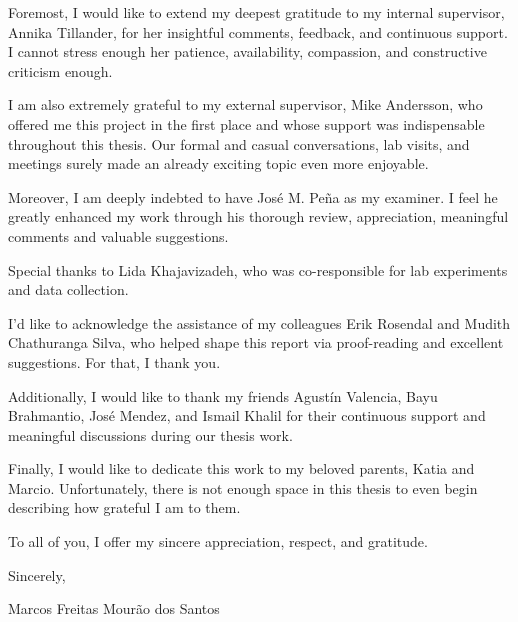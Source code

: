 

Foremost, I would like to extend my deepest gratitude to my internal supervisor, Annika Tillander, for her insightful comments, feedback, and continuous support. I cannot stress enough her patience, availability, compassion, and constructive criticism enough.

I am also extremely grateful to my external supervisor, Mike Andersson, who offered me this project in the first place and whose support was indispensable throughout this thesis. Our formal and casual conversations, lab visits, and meetings surely made an already exciting topic even more enjoyable.

Moreover, I am deeply indebted to have José M. Peña as my examiner. I feel he greatly enhanced my work through his thorough review, appreciation, meaningful comments and valuable suggestions.

Special thanks to Lida Khajavizadeh, who was co-responsible for lab experiments and data collection.

I’d like to acknowledge the assistance of my colleagues Erik Rosendal and Mudith Chathuranga Silva, who helped shape this report via proof-reading and excellent suggestions. For that, I thank you.

Additionally, I would like to thank my friends Agustín Valencia, Bayu Brahmantio, José Mendez, and Ismail Khalil for their continuous support and meaningful discussions during our thesis work.

Finally, I would like to dedicate this work to my beloved parents, Katia and Marcio. Unfortunately, there is not enough space in this thesis to even begin describing how grateful I am to them.

To all of you, I offer my sincere appreciation, respect, and gratitude.

\null\hfill Sincerely,

\null\hfill Marcos Freitas Mourão dos Santos




